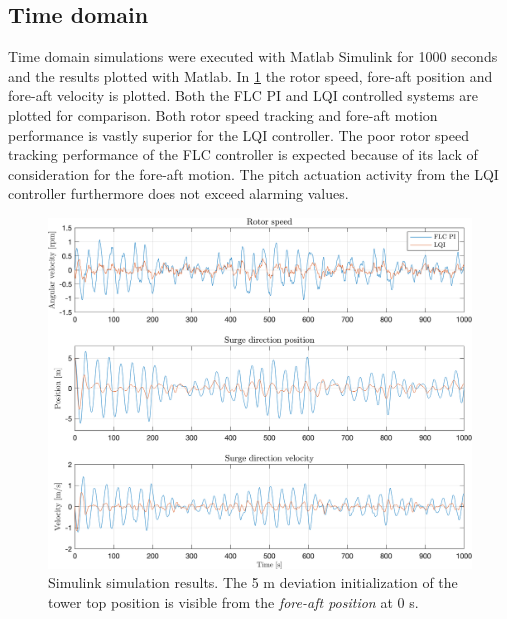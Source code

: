 \clearpage
\subsection{Time domain}
Time domain simulations were executed with Matlab Simulink for 1000 seconds and the results plotted with Matlab. In \cref{fig:sim_11_W_py_vy_comp} the rotor speed, fore-aft position and fore-aft velocity is plotted. Both the FLC PI and LQI controlled systems are plotted for comparison. Both rotor speed tracking and fore-aft motion performance is vastly superior for the LQI controller. The poor rotor speed tracking performance of the FLC controller is expected because of its lack of consideration for the fore-aft motion. The pitch actuation activity from the LQI controller furthermore does not exceed alarming values.
\begin{figure}[ht]
	\centering
	\includegraphics[width=0.7\linewidth]{Graphics/TestResults/linearModPerf/sim_11_W_py_vy_comp.png}
	\caption{Simulink simulation results. The 5 m deviation initialization of the tower top position is visible from the \textit{fore-aft position} at 0 s.}
	\label{fig:sim_11_W_py_vy_comp}
\end{figure}